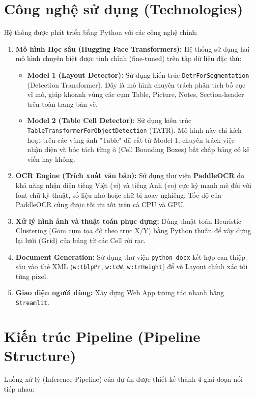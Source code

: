 \documentclass[12pt,a4paper]{article}
\begin{document}
\section{Công nghệ sử dụng (Technologies)}
Hệ thống được phát triển bằng Python với các công nghệ chính:
\begin{enumerate}
    \item \textbf{Mô hình Học sâu (Hugging Face Transformers):} Hệ thống sử dụng hai mô hình chuyên biệt được tinh chỉnh (fine-tuned) trên tập dữ liệu đặc thù:
    \begin{itemize}
        \item \textbf{Model 1 (Layout Detector):} Sử dụng kiến trúc \texttt{DetrForSegmentation} (Detection Transformer). Đây là mô hình chuyên trách phân tích bố cục vĩ mô, giúp khoanh vùng các cụm Table, Picture, Notes, Section-header trên toàn trang bản vẽ.
        \item \textbf{Model 2 (Table Cell Detector):} Sử dụng kiến trúc \texttt{TableTransformerForObjectDetection} (TATR). Mô hình này chỉ kích hoạt trên các vùng ảnh "Table" đã cắt từ Model 1, chuyên trách việc nhận diện và bóc tách từng ô (Cell Bounding Boxes) bất chấp bảng có kẻ viền hay không.
    \end{itemize}
    \item \textbf{OCR Engine (Trích xuất văn bản):} Sử dụng thư viện \textbf{PaddleOCR} do khả năng nhận diện tiếng Việt (\textit{vi}) và tiếng Anh (\textit{en}) cực kỳ mạnh mẽ đối với font chữ kỹ thuật, số liệu nhỏ hoặc chữ bị xoay nghiêng. Tốc độ của PaddleOCR cũng được tối ưu tốt trên cả CPU và GPU.
    \item \textbf{Xử lý hình ảnh và thuật toán phục dựng:} Dùng thuật toán Heuristic Clustering (Gom cụm tọa độ theo trục X/Y) bằng Python thuần để xây dựng lại lưới (Grid) của bảng từ các Cell rời rạc.
    \item \textbf{Document Generation:} Sử dụng thư viện \texttt{python-docx} kết hợp can thiệp sâu vào thẻ XML (\texttt{w:tblpPr}, \texttt{w:tcW}, \texttt{w:trHeight}) để vẽ Layout chính xác tới từng pixel.
    \item \textbf{Giao diện người dùng:} Xây dựng Web App tương tác nhanh bằng \texttt{Streamlit}.
\end{enumerate}

\section{Kiến trúc Pipeline (Pipeline Structure)}
Luồng xử lý (Inference Pipeline) của dự án được thiết kế thành 4 giai đoạn nối tiếp nhau:
\end{document}
